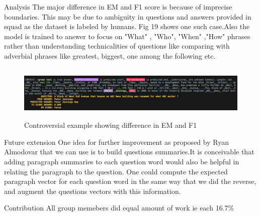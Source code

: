 \documentclass{article}
\begin{document}
\begin{psection}{Analysis}
The major difference in EM and F1 score is because of imprecise boundaries. This may be due to ambiguity in questions and answers provided in squad as the dataset is labeled by humans. Fig 19 shows one such case.Also the model is trained to answer to focus on "What" , "Who", "When" ,"How" phrases rather than understanding technicalities of questions like comparing with adverbial phrases like greatest, biggest, one among the following etc.

 \begin{figure}[ht!]
	    \includegraphics[trim={0 4mm 0 0},clip,height=100px]{includes/2.png}
		\caption{Controversial example showing difference in EM and F1}
	\end{figure}

\end{psection}

\begin{psection}{Future extension}
One idea for further improvement as proposed by Ryan Almodovar that we can use  is to build questions summaries.It is conceivable that adding paragraph summaries to each question word would also be helpful in relating the paragraph to the question. One could compute the expected paragraph vector for each question word in the same way that we did the reverse, and augment the questions vectors with this information.

\end{psection}


\begin{psection}{Contribution}
All group memebers did equal amount of work ie each 16.7\%
\end{psection}
\end{document}
